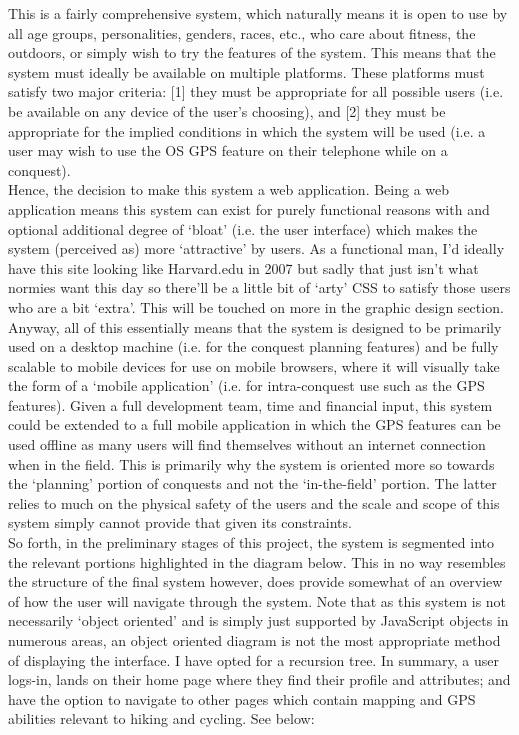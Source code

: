 \documentclass[11pt, english]{article}
\begin{document}
	This is a fairly comprehensive system, which naturally means it is open to use by all age groups, personalities, genders, races, etc., who care about fitness, the outdoors, or simply wish to try the features of the system. This means that the system must ideally be available on multiple platforms. These platforms must satisfy two major criteria: [1] they must be appropriate for all possible users (i.e. be available on any device of the user's choosing), and [2] they must be appropriate for the implied conditions in which the system will be used (i.e. a user may wish to use the OS GPS feature on their telephone while on a conquest).\\

	Hence, the decision to make this system a web application. Being a web application means this system can exist for purely functional reasons with and optional additional degree of `bloat' (i.e. the user interface) which makes the system (perceived as) more `attractive' by users. As a functional man, I'd ideally have this site looking like Harvard.edu in 2007 but sadly that just isn't what normies want this day so there'll be a little bit of `arty' CSS to satisfy those users who are a bit `extra'. This will be touched on more in the graphic design section. Anyway, all of this essentially means that the system is designed to be primarily used on a desktop machine (i.e. for the conquest planning features) and be fully scalable to mobile devices for use on mobile browsers, where it will visually take the form of a `mobile application' (i.e. for intra-conquest use such as the GPS features). Given a full development team, time and financial input, this system could be extended to a full mobile application in  which the GPS features can be used offline as many users will find themselves without an internet connection when in the field. This is primarily why the system is oriented more so towards the `planning' portion of conquests and not the `in-the-field' portion. The latter relies to much on the physical safety of the users and the scale and scope of this system simply cannot provide that given its constraints.\\

	So forth, in the preliminary stages of this project, the system is segmented into the relevant portions highlighted in the diagram below. This in no way resembles the structure of the final system however, does provide somewhat of an overview of how the user will navigate through the system. Note that as this system is not necessarily `object oriented' and is simply just supported by JavaScript objects in numerous areas, an object oriented diagram is not the most appropriate method of displaying the interface. I have opted for a recursion tree. In summary, a user logs-in, lands on their home page where they find their profile and attributes; and have the option to navigate to other pages which contain mapping and GPS abilities relevant to hiking and cycling. See below:
\end{document}
